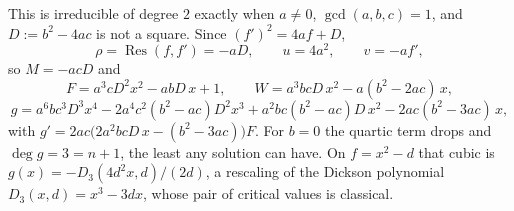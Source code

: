 \begin{example}[$f = ax^{2} + bx + c$]\label{Exquad}
  This is irreducible of degree $2$ exactly when $a \neq 0$, $\gcd(a,b,c) = 1$,
  and $D := b^{2} - 4ac$ is not a square. Since $(f')^{2} = 4af + D$,
  \[
    \rho = \operatorname{Res}(f,f') = -aD, \qquad u = 4a^{2}, \qquad v = -af',
  \]
  so $M = -acD$ and
  \[
    F = a^{3}cD^{2}x^{2} - abD\,x + 1, \qquad
    W = a^{3}bcD\,x^{2} - a(b^{2}-2ac)\,x ,
  \]
  \[
    g = a^{6}bc^{3}D^{3}x^{4} - 2a^{4}c^{2}(b^{2}-ac)D^{2}x^{3}
        + a^{2}bc(b^{2}-ac)D\,x^{2} - 2ac(b^{2}-3ac)\,x ,
  \]
  with $g' = 2ac\bigl(2a^{2}bcD\,x - (b^{2}-3ac)\bigr)F$. For $b = 0$ the
  quartic term drops and $\deg g = 3 = n+1$, the least any solution can have.
  On $f = x^{2} - d$ that cubic is $g(x) = -D_{3}(4d^{2}x, d)/(2d)$, a rescaling
  of the Dickson polynomial $D_{3}(x,d) = x^{3} - 3dx$, whose pair of critical
  values is classical.

\end{example}

